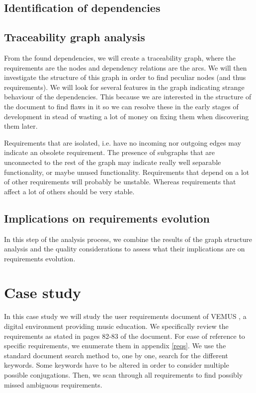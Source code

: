 \documentclass[a4paper,twoside, twocolumn,11pt]{article}
\numberwithin{equation}{section}
\begin{document}
\subsection{Identification of dependencies}

\subsection{Traceability graph analysis}
From the found dependencies, we will create a traceability graph, where the requirements are the nodes and dependency relations are the arcs. We will then investigate the structure of this graph in order to find peculiar nodes (and thus requirements). We will look for several features in the graph indicating strange behaviour of the dependencies. This because we are interested in the structure of the document to find flaws in it so we can resolve these in the early stages of development in stead of wasting a lot of money on fixing them when discovering them later. 

Requirements that are isolated, i.e. have no incoming nor outgoing edges may indicate an obsolete requirement. The presence of subgraphs that are unconnected to the rest of the graph may indicate really well separable functionality, or maybe unused functionality. Requirements that depend on a lot of other requirements will probably be unstable. Whereas requirements that affect a lot of others should be very stable. 

\subsection{Implications on requirements evolution}
In this step of the analysis process, we combine the results of the graph structure analysis and the quality considerations to assess what their implications are on requirements evolution.

\section{Case study}
In this case study we will study the user requirements document of VEMUS \cite{VEMUS}, a digital environment providing music education. We specifically review the requirements as stated in pages 82-83 of the document. For ease of reference to specific requirements, we enumerate them in appendix \ref{reqs}. We use the standard document search method to, one by one, search for the different keywords. Some keywords have to be altered in order to consider multiple possible conjugations. Then, we scan through all requirements to find possibly missed ambiguous requirements.
\end{document}
